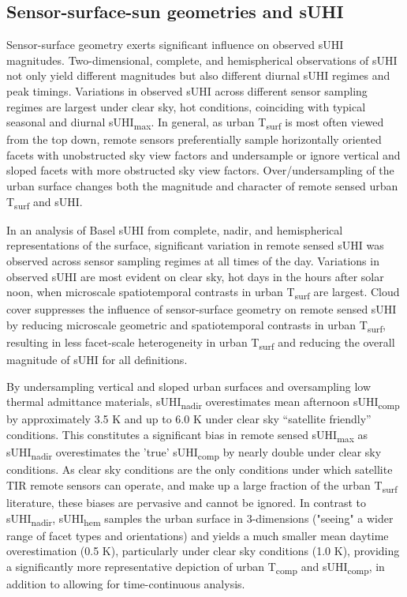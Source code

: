 \begin{bibunit}
\subsection{Sensor-surface-sun geometries and sUHI}

Sensor-surface geometry exerts significant influence on observed sUHI magnitudes. Two-dimensional, complete, and hemispherical observations of sUHI not only yield different magnitudes but also different diurnal sUHI regimes and peak timings. Variations in observed sUHI across different sensor sampling regimes are largest under clear sky, hot conditions, coinciding with typical seasonal and diurnal sUHI\textsubscript{max}. In general, as urban T\textsubscript{surf} is most often viewed from the top down, remote sensors preferentially sample horizontally oriented facets with unobstructed sky view factors and undersample or ignore vertical and sloped facets with more obstructed sky view factors. Over/undersampling of the urban surface changes both the magnitude and character of remote sensed urban T\textsubscript{surf} and sUHI. 

In an analysis of Basel sUHI from complete, nadir, and hemispherical representations of the surface, significant variation in remote sensed sUHI was observed across sensor sampling regimes at all times of the day. Variations in observed sUHI are most evident on clear sky, hot days in the hours after solar noon, when microscale spatiotemporal contrasts in urban T\textsubscript{surf} are largest. Cloud cover suppresses the influence of sensor-surface geometry on remote sensed sUHI by reducing microscale geometric and spatiotemporal contrasts in urban T\textsubscript{surf}, resulting in less facet-scale heterogeneity in urban T\textsubscript{surf} and reducing the overall magnitude of sUHI for all definitions. 

By undersampling vertical and sloped urban surfaces and oversampling low thermal admittance materials, sUHI\textsubscript{nadir} overestimates mean afternoon sUHI\textsubscript{comp} by approximately 3.5 \si{\kelvin} and up to 6.0 \si{\kelvin} under clear sky “satellite friendly” conditions. This constitutes a significant bias in remote sensed sUHI\textsubscript{max} as sUHI\textsubscript{nadir} overestimates the 'true' sUHI\textsubscript{comp} by nearly double under clear sky conditions. As clear sky conditions are the only conditions under which satellite TIR remote sensors can operate, and make up a large fraction of the urban T\textsubscript{surf} literature, these biases are pervasive and cannot be ignored. In contrast to sUHI\textsubscript{nadir}, sUHI\textsubscript{hem} samples the urban surface in 3-dimensions ("seeing" a wider range of facet types and orientations) and yields a much smaller mean daytime overestimation (0.5 \si{\kelvin}), particularly under clear sky conditions (1.0 \si{\kelvin}), providing a significantly more representative depiction of urban T\textsubscript{comp} and sUHI\textsubscript{comp}, in addition to allowing for time-continuous analysis.


\end{bibunit}
